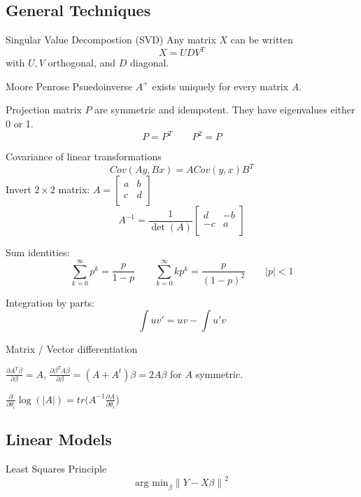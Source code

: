 \documentclass[10pt, twocolumn]{article}
\newcommand{\norm}[1]{\left\lVert#1\right\rVert}
\begin{document}
\newpage

\subsection*{General Techniques}

Singular Value Decompostion (SVD) Any matrix $X$ can be written
\[
    X = UDV^T
\]
with $U, V$ orthogonal, and $D$ diagonal.

Moore Penrose Psuedoinverse $A^+$ exists uniquely for every matrix $A$.

Projection matrix $P$ are symmetric and idempotent. They have eigenvalues
either 0 or 1.
\[
    P = P^T \qquad P^2 = P
\]

Covariance of linear transformations
\[
    Cov(Ay, Bx) = A Cov(y, x) B^T
\]
Invert $2 \times 2$ matrix:
$
    A = 
    [\begin{smallmatrix}
        a & b \\
        c & d \\
    \end{smallmatrix}]
$
\[
    A^{-1} = 
    \frac{1}{\det (A)}
    \begin{bmatrix}
        d & -b \\
        -c & a \\
    \end{bmatrix}
\]

Sum identities:
\[
    \sum_{k=0}^{\infty} p^k = \frac{p}{1 - p} \qquad 
    \sum_{k=0}^{\infty} k p^k = \frac{p}{(1 - p)^2} \qquad |p| < 1
\]

Integration by parts:
\[
    \int uv' = uv - \int u'v
\]

Matrix / Vector differentiation

$\frac{\partial A^T \beta}{\partial \beta} = A$, 
$\frac{\partial \beta^T A \beta}{\partial \beta} = (A + A^t) \beta =
2A\beta$ for $A$ symmetric.

$\frac{\partial}{\partial \theta_i} \log (|A|) =
tr( A^{-1} \frac{\partial A}{\partial \theta_i}$)

\newpage

\subsection*{Linear Models}

Least Squares Principle
\[
    \text{arg min}_\beta \norm{Y - X\beta}^2
\]
\end{document}
